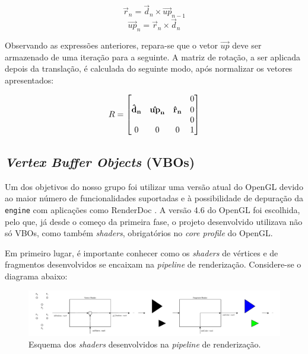 \documentclass[12pt, a4paper]{article}
\begin{document}
$$
\vec{r}_n = \vec{d}_n \times \vec{up}_{n - 1}
$$
$$
\vec{up}_n = \vec{r}_n \times \vec{d}_n
$$

Observando as expressões anteriores, repara-se que o vetor $\vec{up}$ deve ser armazenado de uma
iteração para a seguinte. A matriz de rotação, a ser aplicada depois da translação, é calculada do
seguinte modo, após normalizar os vetores apresentados:

$$
\def\arraystretch{1}
R = \begin{bmatrix}
                 &               &              & 0 \\
    \bf\hat{d}_n & \bf\hat{up}_n & \bf\hat{r}_n & 0 \\
                 &               &              & 0 \\
               0 &             0 &            0 & 1
\end{bmatrix}
$$

\subsection{\emph{Vertex Buffer Objects} (VBOs)}

Um dos objetivos do nosso grupo foi utilizar uma versão atual do OpenGL devido ao maior número de
funcionalidades suportadas e à possibilidade de depuração da \texttt{engine} com aplicações como
RenderDoc \cite{renderdoc}. A versão 4.6 do OpenGL foi escolhida, pelo que, já desde o começo da
primeira fase, o projeto desenvolvido utilizava não só VBOs, como também \emph{shaders},
obrigatórios no \emph{core profile} do OpenGL.

Em primeiro lugar, é importante conhecer como os \emph{shaders} de vértices e de fragmentos
desenvolvidos se encaixam na \emph{pipeline} de renderização. Considere-se o diagrama abaixo:

\begin{figure}[H]
    \centering
    \includegraphics[width=\textwidth]{res/phase3/Shaders.pdf}
    \caption{Esquema dos \emph{shaders} desenvolvidos na \emph{pipeline} de renderização.}
\end{figure}
\end{document}
